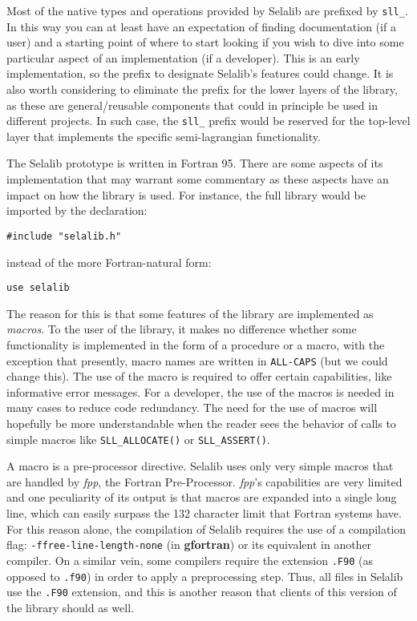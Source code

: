 \documentclass[]{report}   %
\begin{document}
Most of the native types and operations provided by Selalib are prefixed by \verb+sll_+. In this way you can at least have an expectation of finding documentation (if a user) and a starting point of where to start looking if you wish to dive into some particular aspect of an implementation (if a developer). This is an early implementation, so the prefix to designate Selalib's features could change. It is also worth considering to eliminate the prefix for the lower layers of the library, as these are general/reusable components that could in principle be used in different projects. In such case, the \verb+sll_+ prefix would be reserved for the top-level layer that implements the specific semi-lagrangian functionality.

The Selalib prototype is written in Fortran 95. There are some aspects of its implementation that may warrant some commentary as these aspects have an impact on how the library is used. For instance, the full library would be imported by the declaration:
\begin{verbatim}
#include "selalib.h"
\end{verbatim}
instead of the more Fortran-natural form:
\begin{verbatim}
use selalib
\end{verbatim}
The reason for this is that some features of the library are implemented as \emph{macros}. To the user of the library, it makes no difference whether some functionality is implemented in the form of a procedure or a macro, with the exception that presently, macro names are written in \verb+ALL-CAPS+ (but we could change this). The use of the macro is required to offer certain capabilities, like informative error messages. For a developer, the use of the macros is needed in many cases to reduce code redundancy. The need for the use of macros will hopefully be more understandable when the reader sees the behavior of calls to simple macros like \verb+SLL_ALLOCATE()+ or \verb+SLL_ASSERT()+.

A macro is a pre-processor directive. Selalib uses only very simple macros that are handled by \emph{fpp}, the Fortran Pre-Processor. \emph{fpp}'s capabilities are very limited and one peculiarity of its output is that macros are expanded into a single long line, which can easily surpass the 132 character limit that Fortran systems have. For this reason alone, the compilation of Selalib requires the use of a compilation flag: \verb+-ffree-line-length-none+ (in \textbf{gfortran}) or its equivalent in another compiler. On a similar vein, some compilers require the extension \verb+.F90+ (as opposed to \verb+.f90+) in order to apply a preprocessing step. Thus, all files in Selalib use the \verb+.F90+ extension, and this is another reason that clients of this version of the library should as well.
\end{document}
